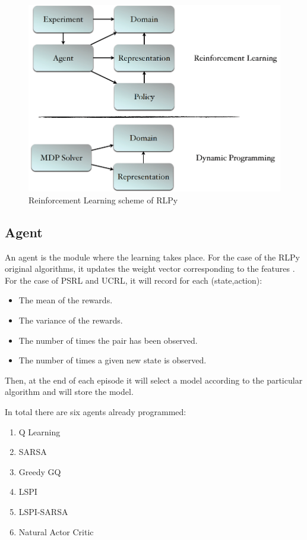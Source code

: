 \documentclass[12pt]{article}
\begin{document}
\begin{figure}[h]
\centering
\includegraphics[trim=0cm 7cm 0cm 0cm, clip=true, scale=.4]{platform.png}
\caption{Reinforcement Learning scheme of RLPy}
\label{fig:RLPy}
\end{figure}

\subsection{Agent}
An agent is the module where the learning takes place. For the case of the RLPy original algorithms, it updates the weight vector corresponding to the features \citep{RLPy}. For the case of PSRL and UCRL, it will record for each (state,action):
\begin{itemize}
\item The mean of the rewards.
\item The variance of the rewards.
\item The number of times the pair has been observed.
\item The number of times a given new state is observed.
\end{itemize}
Then, at the end of each episode it will select a model according to the particular algorithm and will store the model.

In total there are six agents already programmed:
\begin{enumerate}
\item Q Learning
\item SARSA
\item Greedy GQ
\item LSPI
\item LSPI-SARSA
\item Natural Actor Critic
\end{enumerate}
\end{document}
